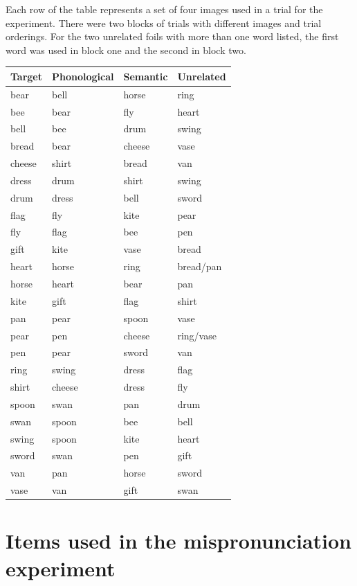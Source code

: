 \documentclass [11pt, proquest] {uwthesis}[2015/03/03]
\begin{document}
Each row of the table represents a set of four images used in a trial
for the experiment. There were two blocks of trials with different
images and trial orderings. For the two unrelated foils with more than
one word listed, the first word was used in block one and the second in
block two.
\begin{longtable}[]{@{}llll@{}}
\toprule
\textbf{Target} & \textbf{Phonological} & \textbf{Semantic} &
\textbf{Unrelated}\tabularnewline
\midrule
\endhead
bear & bell & horse & ring\tabularnewline
bee & bear & fly & heart\tabularnewline
bell & bee & drum & swing\tabularnewline
bread & bear & cheese & vase\tabularnewline
cheese & shirt & bread & van\tabularnewline
dress & drum & shirt & swing\tabularnewline
drum & dress & bell & sword\tabularnewline
flag & fly & kite & pear\tabularnewline
fly & flag & bee & pen\tabularnewline
gift & kite & vase & bread\tabularnewline
heart & horse & ring & bread/pan\tabularnewline
horse & heart & bear & pan\tabularnewline
kite & gift & flag & shirt\tabularnewline
pan & pear & spoon & vase\tabularnewline
pear & pen & cheese & ring/vase\tabularnewline
pen & pear & sword & van\tabularnewline
ring & swing & dress & flag\tabularnewline
shirt & cheese & dress & fly\tabularnewline
spoon & swan & pan & drum\tabularnewline
swan & spoon & bee & bell\tabularnewline
swing & spoon & kite & heart\tabularnewline
sword & swan & pen & gift\tabularnewline
van & pan & horse & sword\tabularnewline
vase & van & gift & swan\tabularnewline
\bottomrule
\end{longtable}
\hypertarget{mp-experiment-items}{\chapter{Items used in the
mispronunciation experiment}\label{mp-experiment-items}}
\end{document}
